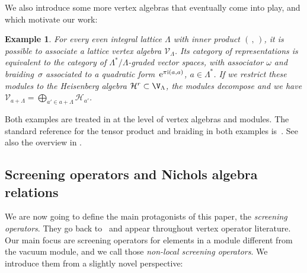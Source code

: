 \documentclass[pdftex]{sigma}%
\numberwithin{equation}{section}
\newtheorem{ese}[teo]{Example}
\begin{document}
We also introduce some more vertex algebras that eventually come into play, and which motivate our work:

\begin{ese}
For every even integral lattice $\Lambda$ with inner product $(\,, \,)$, it is possible to associate a \emph{lattice vertex algebra} $\mathcal{V}_\Lambda$. Its category of representations is equivalent to the category of $\Lambda^*/\Lambda$-graded vector spaces, with associator $\omega$ and braiding~$\sigma$ associated to a quadratic form~${\rm e}^{\pi {\rm i} (a, a)}$, $a \in \Lambda^*$.
If we restrict these modules to the Heisenberg algebra $\mathcal{H}^r\subset \V_\Lambda$, the modules decompose and we have $\mathcal{V}_{a+\Lambda}=\bigoplus_{a'\in a+\Lambda} \mathcal{H}_{a'}$.
\end{ese}

Both examples are treated in \cite{FBZ04,Kac98} at the level of vertex algebras and modules. The standard reference for the tensor product and braiding in both examples is~\cite{DL93}. See also the overview in \cite[Section~2.3]{CGR20}.

\subsection{Screening operators and Nichols algebra relations} \label{smallTheorems}
We are now going to define the main protagonists of this paper, the \emph{screening operators}. They go back to~\cite{DF84} and appear throughout vertex operator literature. Our main focus are screening operators for elements in a module different from the vacuum module, and we call those \emph{non-local screening operators}. We introduce them from a slightly novel perspective:
\end{document}
